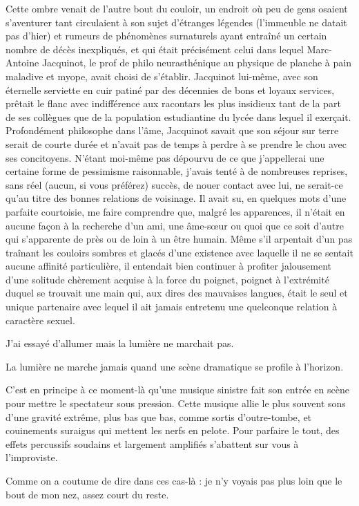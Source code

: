 Cette ombre venait de l’autre bout du couloir, un endroit où peu de gens osaient s’aventurer tant circulaient à son sujet d’étranges légendes (l’immeuble ne datait pas d’hier) et rumeurs de phénomènes surnaturels ayant entraîné un certain nombre de décès inexpliqués, et qui était précisément celui dans lequel Marc-Antoine Jacquinot, le prof de philo neurasthénique au physique de planche à pain maladive et myope, avait choisi de s’établir. Jacquinot lui-même, avec son éternelle serviette en cuir patiné par des décennies de bons et loyaux services, prêtait le flanc avec indifférence aux racontars les plus insidieux tant de la part de ses collègues que de la population estudiantine du lycée dans lequel il exerçait. Profondément philosophe dans l’âme, Jacquinot savait que son séjour sur terre serait de courte durée et n’avait pas de temps à perdre à se prendre le chou avec ses concitoyens. N’étant moi-même pas dépourvu de ce que j’appellerai une certaine forme de pessimisme raisonnable, j’avais tenté à de nombreuses reprises, sans réel (aucun, si vous préférez) succès, de nouer contact avec lui, ne serait-ce qu’au titre des bonnes relations de voisinage. Il avait su, en quelques mots d’une parfaite courtoisie, me faire comprendre que, malgré les apparences, il n’était en aucune façon à la recherche d’un ami, une âme-sœur ou quoi que ce soit d’autre qui s’apparente de près ou de loin à un être humain. Même s’il arpentait d’un pas traînant les couloirs sombres et glacés d’une existence avec laquelle il ne se sentait aucune affinité particulière, il entendait bien continuer à profiter jalousement d’une solitude chèrement acquise à la force du poignet, poignet à l’extrémité duquel se trouvait une main qui, aux dires des mauvaises langues, était le seul et unique partenaire avec lequel il ait jamais entretenu une quelconque relation à caractère sexuel.

J’ai essayé d’allumer mais la lumière ne marchait pas.

La lumière ne marche jamais quand une scène dramatique se profile à l’horizon.

C’est en principe à ce moment-là qu’une musique sinistre fait son entrée en scène pour mettre le spectateur sous pression. Cette musique allie le plus souvent sons d’une gravité extrême, plus bas que bas, comme sortis d’outre-tombe, et couinements suraigus qui mettent les nerfs en pelote. Pour parfaire le tout, des effets percussifs soudains et largement amplifiés s’abattent sur vous à l’improviste.

Comme on a coutume de dire dans ces cas-là : je n’y voyais pas plus loin que le bout de mon nez, assez court du reste.

